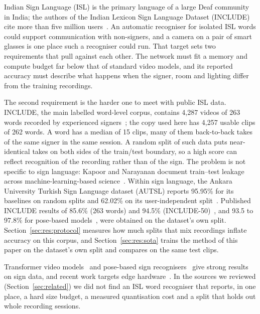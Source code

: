 \documentclass[pdflatex,sn-mathphys-num,twocolumn]{sn-jnl}
\theoremstyle{thmstyleone}%
\begin{document}
Indian Sign Language (ISL) is the primary language of a large Deaf community in India; the authors of the Indian Lexicon Sign Language Dataset (INCLUDE) cite more than five million users~\cite{sridhar2020include}. An automatic recogniser for isolated ISL words could support communication with non-signers, and a camera on a pair of smart glasses is one place such a recogniser could run. That target sets two requirements that pull against each other. The network must fit a memory and compute budget far below that of standard video models, and its reported accuracy must describe what happens when the signer, room and lighting differ from the training recordings.

The second requirement is the harder one to meet with public ISL data. INCLUDE, the main labelled word-level corpus, contains 4,287 videos of 263 words recorded by experienced signers~\cite{sridhar2020include}; the copy used here has 4,257 usable clips of 262 words. A word has a median of 15 clips, many of them back-to-back takes of the same signer in the same session. A random split of such data puts near-identical takes on both sides of the train/test boundary, so a high score can reflect recognition of the recording rather than of the sign. The problem is not specific to sign language: Kapoor and Narayanan document train--test leakage across machine-learning-based science~\cite{kapoor2023leakage}. Within sign language, the Ankara University Turkish Sign Language dataset (AUTSL) reports 95.95\% for its baselines on random splits and 62.02\% on its user-independent split~\cite{sincan2020autsl}. Published INCLUDE results of 85.6\% (263 words) and 94.5\% (INCLUDE-50)~\cite{sridhar2020include}, and 93.5 to 97.8\% for pose-based models~\cite{selvaraj2022openhands,patra2024hwgat}, were obtained on the dataset's own split. Section~\ref{sec:res:protocol} measures how much splits that mix recordings inflate accuracy on this corpus, and Section~\ref{sec:res:sota} trains the method of this paper on the dataset's own split and compares on the same test clips.

Transformer video models~\cite{arnab2021vivit,bertasius2021timesformer} and pose-based sign recognisers~\cite{bohacek2022spoter,jiang2021samslr,selvaraj2022openhands} give strong results on sign data, and recent work targets edge hardware~\cite{lamaakal2026tinymslr,venkatappa2026kannada}. In the sources we reviewed (Section~\ref{sec:related}) we did not find an ISL word recogniser that reports, in one place, a hard size budget, a measured quantisation cost and a split that holds out whole recording sessions.
\end{document}
